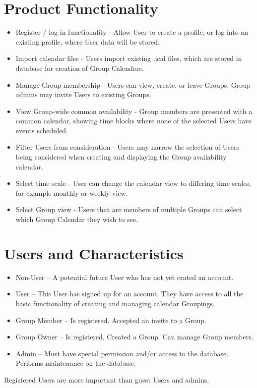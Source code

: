 \documentclass{scrreprt}
\begin{document}
\section{Product Functionality}
\begin{itemize}
\item Register / log-in functionality - Allow User to create a profile, or log
into an existing profile, where User data will be stored.
\item Import calendar files - Users import existing .ical files, which are
stored in database for creation of Group Calendars.
\item Manage Group membership - Users can view, create, or leave Groups. Group
admins may invite Users to existing Groups.
\item View Group-wide common availability - Group members are presented with a
common calendar, showing time blocks where none of the selected Users have
events scheduled.
\item Filter Users from consideration - Users may narrow the selection of Users
being considered when creating and displaying the Group availability calendar.
\item Select time scale - User can change the calendar view to differing time 
scales, for example monthly or weekly view.
\item Select Group view - Users that are members of multiple Groups can select
which Group Calendar they wish to see.
\end{itemize}

\section{Users and Characteristics}
\begin{itemize}
	\item Non-User – A potential future User who has not yet crated an account.
    \item User – This User has signed up for an account. They have access to
all the basic functionality of creating and managing calendar Groupings.
    \item Group Member – Is registered. Accepted an invite to a Group.
    \item Group Owner – Is registered. Created a Group. Can manage Group members.
    \item Admin – Must have special permission and/or access to the database. Performs
maintenance on the database.
\end{itemize}
Registered Users are more important than guest Users and admins.
\end{document}
